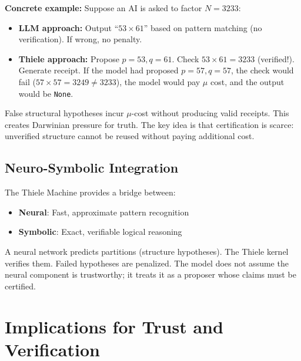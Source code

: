 \textbf{Concrete example:} Suppose an AI is asked to factor $N = 3233$:
\begin{itemize}
    \item \textbf{LLM approach:} Output ``$53 \times 61$'' based on pattern matching (no verification). If wrong, no penalty.
    \item \textbf{Thiele approach:} Propose $p = 53, q = 61$. Check $53 \times 61 = 3233$ (verified!). Generate receipt. If the model had proposed $p = 57, q = 57$, the check would fail ($57 \times 57 = 3249 \neq 3233$), the model would pay $\mu$ cost, and the output would be \texttt{None}.
\end{itemize}


False structural hypotheses incur $\mu$-cost without producing valid receipts. This creates Darwinian pressure for truth. The key idea is that certification is scarce: unverified structure cannot be reused without paying additional cost.

\subsection{Neuro-Symbolic Integration}

The Thiele Machine provides a bridge between:
\begin{itemize}
    \item \textbf{Neural}: Fast, approximate pattern recognition
    \item \textbf{Symbolic}: Exact, verifiable logical reasoning
\end{itemize}

A neural network predicts partitions (structure hypotheses). The Thiele kernel verifies them. Failed hypotheses are penalized. The model does not assume the neural component is trustworthy; it treats it as a proposer whose claims must be certified.

\section{Implications for Trust and Verification}

